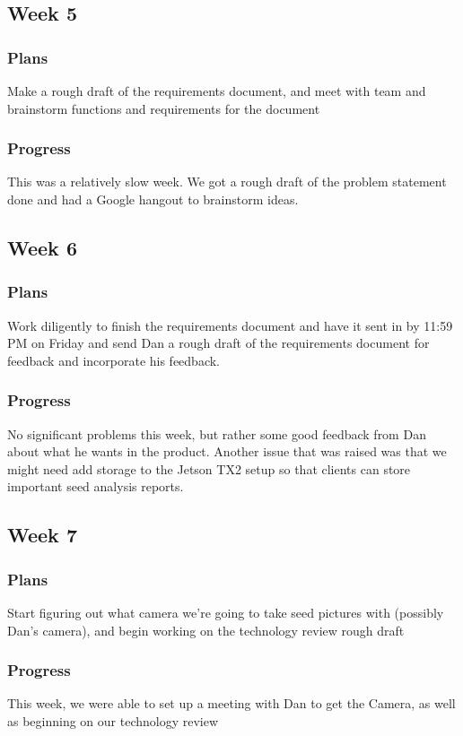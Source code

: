 \documentclass[onecolumn, draftclsnofoot,10pt, compsoc]{IEEEtran}
\begin{document}
    \subsection{Week 5}
        \subsubsection{Plans}
        Make a rough draft of the requirements document, and meet with team and brainstorm functions and requirements for the document
        \subsubsection{Progress}
        This was a relatively slow week. We got a rough draft of the problem statement done and had a Google hangout to brainstorm ideas.

    \subsection{Week 6}
        \subsubsection{Plans}
        Work diligently to finish the requirements document and have it sent in by 11:59 PM on Friday and send Dan a rough draft of the requirements document for feedback and incorporate his feedback.
        
        \subsubsection{Progress}
        No significant problems this week, but rather some good feedback from Dan about what he wants in the product. Another issue that was raised was that we might need add storage to the Jetson TX2 setup so that clients can store important seed analysis reports.

    \subsection{Week 7}
        \subsubsection{Plans}
        Start figuring out what camera we're going to take seed pictures with (possibly Dan's camera), and begin working on the technology review rough draft
        \subsubsection{Progress}
        This week, we were able to set up a meeting with Dan to get the Camera, as well as beginning on our technology review
\end{document}
